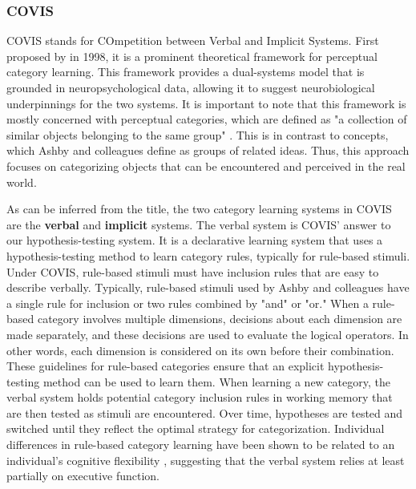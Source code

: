 \documentclass[../dissertation.tex]{subfiles}
\begin{document}
\subsubsection{COVIS}
COVIS stands for COmpetition between Verbal and Implicit Systems. First proposed by \citeauthor{Ashby1998} in 1998, it is a prominent theoretical framework for perceptual category learning. This framework provides a dual-systems model that is grounded in neuropsychological data, allowing it to suggest neurobiological underpinnings for the two systems. It is important to note that this framework is mostly concerned with perceptual categories, which are defined as "a collection of similar objects belonging to the same group" \citep[~p. 151]{Ashby2005}. This is in contrast to concepts, which Ashby and colleagues define as groups of related ideas. Thus, this approach focuses on categorizing objects that can be encountered and perceived in the real world. \par
	As can be inferred from the title, the two category learning systems in COVIS are the \textbf{verbal} and \textbf{implicit} systems. The verbal system is COVIS' answer to our hypothesis-testing system. It is a declarative learning system that uses a hypothesis-testing method to learn category rules, typically for rule-based stimuli. Under COVIS, rule-based stimuli must have inclusion rules that are easy to describe verbally. Typically, rule-based stimuli used by Ashby and colleagues have a single rule for inclusion or two rules combined by "and" or "or."  When a rule-based category involves multiple dimensions, decisions about each dimension are made separately, and these decisions are used to evaluate the logical operators. In other words, each dimension is considered on its own before their combination. These guidelines for rule-based categories ensure that an explicit hypothesis-testing method can be used to learn them. When learning a new category, the verbal system holds potential category inclusion rules in working memory that are then tested as stimuli are encountered. Over time, hypotheses are tested and switched until they reflect the optimal strategy for categorization. Individual differences in rule-based category learning have been shown to be related to an individual's cognitive flexibility \citep{Reetzke2016}, suggesting that the verbal system relies at least partially on executive function. \par
\end{document}
